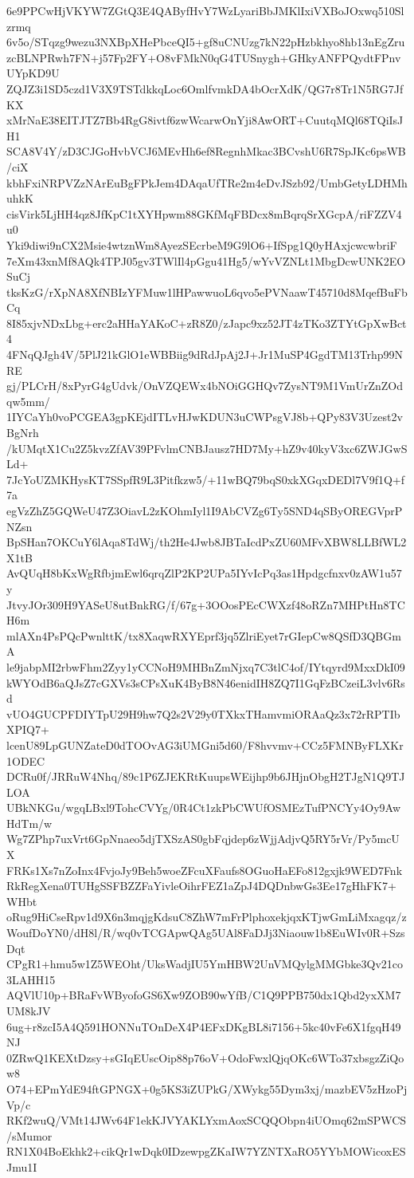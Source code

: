 6e9PPCwHjVKYW7ZGtQ3E4QAByfHvY7WzLyariBbJMKlIxiVXBoJOxwq510Slzrmq
6v5o/STqzg9wezu3NXBpXHePbceQI5+gf8uCNUzg7kN22pHzbkhyo8hb13nEgZru
zcBLNPRwh7FN+j57Fp2FY+O8vFMkN0qG4TUSnygh+GHkyANFPQydtFPnvUYpKD9U
ZQJZ3i1SD5czd1V3X9TSTdkkqLoc6OmlfvmkDA4bOcrXdK/QG7r8Tr1N5RG7JfKX
xMrNaE38EITJTZ7Bb4RgG8ivtf6zwWcarwOnYji8AwORT+CuutqMQl68TQiIsJH1
SCA8V4Y/zD3CJGoHvbVCJ6MEvHh6ef8RegnhMkac3BCvshU6R7SpJKc6psWB/ciX
kbhFxiNRPVZzNArEuBgFPkJem4DAqaUfTRe2m4eDvJSzb92/UmbGetyLDHMhuhkK
cisVirk5LjHH4qz8JfKpC1tXYHpwm88GKfMqFBDcx8mBqrqSrXGcpA/riFZZV4u0
Yki9diwi9nCX2Msie4wtznWm8AyezSEcrbeM9G9lO6+IfSpg1Q0yHAxjcwcwbriF
7eXm43xnMf8AQk4TPJ05gv3TWlIl4pGgu41Hg5/wYvVZNLt1MbgDcwUNK2EOSuCj
tksKzG/rXpNA8XfNBIzYFMuw1lHPawwuoL6qvo5ePVNaawT45710d8MqefBuFbCq
8I85xjvNDxLbg+erc2aHHaYAKoC+zR8Z0/zJapc9xz52JT4zTKo3ZTYtGpXwBct4
4FNqQJgh4V/5PlJ21kGlO1eWBBiig9dRdJpAj2J+Jr1MuSP4GgdTM13Trhp99NRE
gj/PLCrH/8xPyrG4gUdvk/OnVZQEWx4bNOiGGHQv7ZysNT9M1VmUrZnZOdqw5mm/
1IYCaYh0voPCGEA3gpKEjdITLvHJwKDUN3uCWPsgVJ8b+QPy83V3Uzest2vBgNrh
/kUMqtX1Cu2Z5kvzZfAV39PFvlmCNBJausz7HD7My+hZ9v40kyV3xc6ZWJGwSLd+
7JcYoUZMKHysKT7SSpfR9L3Pitfkzw5/+11wBQ79bqS0xkXGqxDEDl7V9f1Q+f7a
egVzZhZ5GQWeU47Z3OiavL2zKOhmIyl1I9AbCVZg6Ty5SND4qSByOREGVprPNZsn
BpSHan7OKCuY6lAqa8TdWj/th2He4Jwb8JBTaIcdPxZU60MFvXBW8LLBfWL2X1tB
AvQUqH8bKxWgRfbjmEwl6qrqZlP2KP2UPa5IYvIcPq3as1Hpdgcfnxv0zAW1u57y
JtvyJOr309H9YASeU8utBnkRG/f/67g+3OOosPEcCWXzf48oRZn7MHPtHn8TCH6m
mlAXn4PsPQcPwnlttK/tx8XaqwRXYEprf3jq5ZlriEyet7rGIepCw8QSfD3QBGmA
le9jabpMI2rbwFhm2Zyy1yCCNoH9MHBnZmNjxq7C3tlC4of/IYtqyrd9MxxDkI09
kWYOdB6aQJsZ7cGXVs3sCPsXuK4ByB8N46enidIH8ZQ7I1GqFzBCzeiL3vlv6Rsd
vUO4GUCPFDIYTpU29H9hw7Q2s2V29y0TXkxTHamvmiORAaQz3x72rRPTIbXPIQ7+
lcenU89LpGUNZateD0dTOOvAG3iUMGni5d60/F8hvvmv+CCz5FMNByFLXKr1ODEC
DCRu0f/JRRuW4Nhq/89c1P6ZJEKRtKuupsWEijhp9b6JHjnObgH2TJgN1Q9TJLOA
UBkNKGu/wgqLBxl9TohcCVYg/0R4Ct1zkPbCWUfOSMEzTufPNCYy4Oy9AwHdTm/w
Wg7ZPhp7uxVrt6GpNnaeo5djTXSzAS0gbFqjdep6zWjjAdjvQ5RY5rVr/Py5mcUX
FRKs1Xs7nZoInx4FvjoJy9Beh5woeZFcuXFaufs8OGuoHaEFo812gxjk9WED7Fnk
RkRegXena0TUHgSSFBZZFaYivleOihrFEZ1aZpJ4DQDnbwGs3Ee17gHhFK7+WHbt
oRug9HiCseRpv1d9X6n3mqjgKdsuC8ZhW7mFrPlphoxekjqxKTjwGmLiMxagqz/z
WoufDoYN0/dH8l/R/wq0vTCGApwQAg5UAl8FaDJj3Niaouw1b8EuWIv0R+SzsDqt
CPgR1+hmu5w1Z5WEOht/UksWadjIU5YmHBW2UnVMQylgMMGbke3Qv21co3LAHH15
AQVlU10p+BRaFvWByofoGS6Xw9ZOB90wYfB/C1Q9PPB750dx1Qbd2yxXM7UM8kJV
6ug+r8zcI5A4Q591HONNuTOnDeX4P4EFxDKgBL8i7156+5kc40vFe6X1fgqH49NJ
0ZRwQ1KEXtDzsy+sGIqEUscOip88p76oV+OdoFwxlQjqOKc6WTo37xbsgzZiQow8
O74+EPmYdE94ftGPNGX+0g5KS3iZUPkG/XWykg55Dym3xj/mazbEV5zHzoPjVp/c
RKf2wuQ/VMt14JWv64F1ekKJVYAKLYxmAoxSCQQObpn4iUOmq62mSPWCS/sMumor
RN1X04BoEkhk2+cikQr1wDqk0IDzewpgZKaIW7YZNTXaRO5YYbMOWicoxESJmu1I
